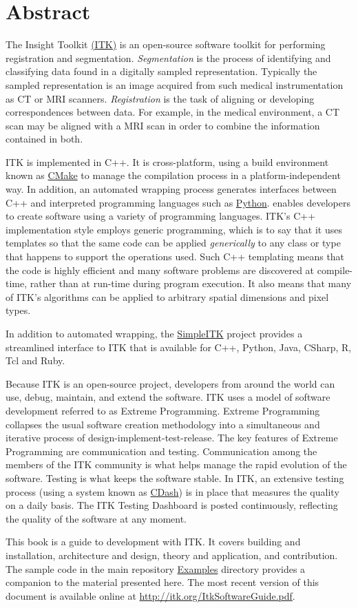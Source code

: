 \chapter*{Abstract}
\noindent
The Insight Toolkit \href{http://itk.org}{(ITK)} is an open-source
software toolkit for performing registration and
segmentation. \emph{Segmentation} is the process of identifying and
classifying data found in a digitally sampled
representation. Typically the sampled representation is an image
acquired from such medical instrumentation as CT or MRI
scanners. \emph{Registration} is the task of aligning or developing
correspondences between data. For example, in the medical environment,
a CT scan may be aligned with a MRI scan in order to combine the
information contained in both.

ITK is implemented in C++. It is cross-platform, using a build
environment known as \href{http://cmake.org}{CMake} to manage the
compilation process in a platform-independent way.
In addition, an automated wrapping process
generates interfaces between C++ and interpreted programming languages
such as
\href{http://www.python.org}{Python}.
enables developers to create software using a variety of programming
languages. ITK's C++ implementation style employs generic
programming, which is to say that it uses templates so that the same
code can be applied \emph{generically} to any class or type that
happens to support the operations used. Such C++
templating means that the code is highly efficient and many
software problems are discovered at compile-time, rather than at
run-time during program execution.  It also means that many of ITK's
algorithms can be applied to arbitrary spatial dimensions and pixel types.

In addition to automated wrapping, the
\href{http://www.itk.org/Wiki/SimpleITK}{SimpleITK} project provides
a streamlined interface to ITK that is available for C++, Python, Java,
CSharp, R, Tcl and Ruby.

Because ITK is an open-source project, developers from around the
world can use, debug, maintain, and extend the software. ITK uses a
model of software development referred to as Extreme
Programming. Extreme Programming collapses the usual software creation
methodology into a simultaneous and iterative process of
design-implement-test-release. The key features of Extreme Programming
are communication and testing. Communication among the members of the
ITK community is what helps manage the rapid evolution of the
software.  Testing is what keeps the software stable. In ITK, an
extensive testing process (using a system known as
\href{http://open.cdash.org/index.php?project=Insight}{CDash}) is in place that
measures the quality on a daily basis. The ITK Testing Dashboard is
posted continuously, reflecting the quality of the software at any
moment.

This book is a guide to development with ITK. It covers building and
installation, architecture and design, theory and application, and
contribution.
The sample code in the main repository
\href{http://itk.org/gitweb?p=ITK.git;a=tree;f=Examples}
{Examples} directory provides a companion to the material presented here.
The most recent version of this document is available online at
\url{http://itk.org/ItkSoftwareGuide.pdf}.

